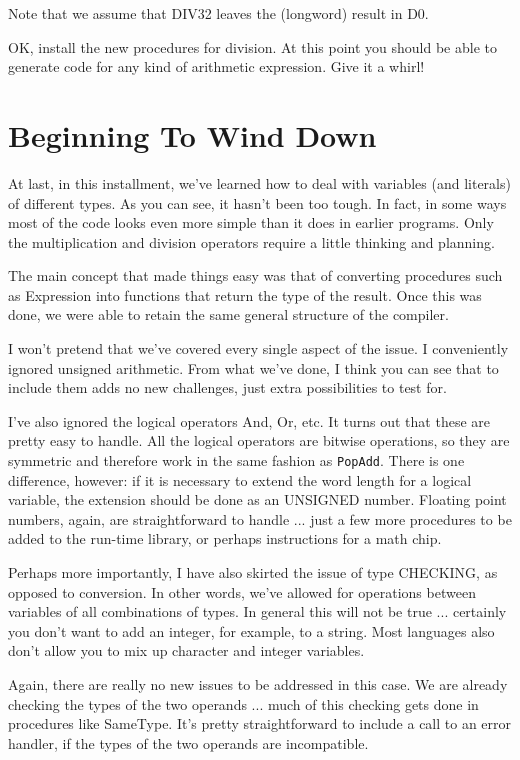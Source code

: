 Note  that  we  assume that DIV32 leaves the (longword) result in D0.

OK, install the new  procedures  for division. At this point you should be able  to  generate  code  for  any  kind  of arithmetic expression. Give it a whirl!

\section{Beginning To Wind Down}

At  last, in this installment, we've learned  how  to  deal  with variables (and literals) of different types. As you can  see, it hasn't been too tough. In  fact, in  some ways most of the code looks even more simple than it does in earlier  programs. Only the  multiplication  and  division  operators  require  a  little thinking and planning.

The main concept that  made  things  easy  was that of converting procedures such as Expression into functions that return the type of the result. Once this  was  done, we were able to retain the same general structure of the compiler.

I won't pretend that  we've  covered  every  single aspect of the issue. I conveniently  ignored  unsigned  arithmetic. From what we've  done, I think you can see that to include them adds no new challenges, just extra possibilities to test for.

I've also ignored the  logical  operators And, Or, etc. It turns out  that  these are pretty easy to  handle. All  the  logical operators are  bitwise  operations, so  they  are  symmetric and therefore work  in  the  same  fashion  as  {\tt PopAdd}. There is one difference, however:    if  it  is necessary to extend the  word length for a logical variable, the extension should be done as an UNSIGNED  number. Floating   point   numbers, again, are straightforward  to  handle  ... just a few more procedures to be added to the run-time library, or perhaps instructions for a math chip.

Perhaps more importantly, I have also skirted the  issue  of type CHECKING, as  opposed  to  conversion. In other  words, we've allowed for operations between variables of  all  combinations of types. In general this will not be true ... certainly  you don't want to add an integer, for example, to a string. Most languages also don't allow you to mix up character and integer variables.

Again, there are  really  no  new  issues to be addressed in this case. We are already checking the types of the two  operands ... much  of this checking gets done  in  procedures  like  SameType. It's  pretty  straightforward  to  include  a  call  to an  error handler, if the types of the two operands are incompatible.


